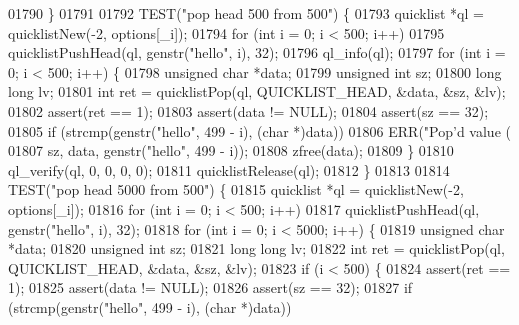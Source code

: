 \begin{DoxyCode}
{{{{{{{{{{{{{{{{{{{{{{{{{{{{{{{{{{{{{{{{{{01790         \}
01791 
01792         TEST(\textcolor{stringliteral}{"pop head 500 from 500"}) \{
01793             quicklist *ql = quicklistNew(-2, options[\_i]);
01794             \textcolor{keywordflow}{for} (\textcolor{keywordtype}{int} i = 0; i < 500; i++)
01795                 quicklistPushHead(ql, genstr(\textcolor{stringliteral}{"hello"}, i), 32);
01796             ql\_info(ql);
01797             \textcolor{keywordflow}{for} (\textcolor{keywordtype}{int} i = 0; i < 500; i++) \{
01798                 \textcolor{keywordtype}{unsigned} \textcolor{keywordtype}{char} *data;
01799                 \textcolor{keywordtype}{unsigned} \textcolor{keywordtype}{int} sz;
01800                 \textcolor{keywordtype}{long} \textcolor{keywordtype}{long} lv;
01801                 \textcolor{keywordtype}{int} ret = quicklistPop(ql, QUICKLIST\_HEAD, &data, &sz, &lv);
01802                 assert(ret == 1);
01803                 assert(data != NULL);
01804                 assert(sz == 32);
01805                 \textcolor{keywordflow}{if} (strcmp(genstr(\textcolor{stringliteral}{"hello"}, 499 - i), (\textcolor{keywordtype}{char} *)data))
01806                     ERR(\textcolor{stringliteral}{"Pop'd value (%
01807                         sz, data, genstr(\textcolor{stringliteral}{"hello"}, 499 - i));
01808                 zfree(data);
01809             \}
01810             ql\_verify(ql, 0, 0, 0, 0);
01811             quicklistRelease(ql);
01812         \}
01813 
01814         TEST(\textcolor{stringliteral}{"pop head 5000 from 500"}) \{
01815             quicklist *ql = quicklistNew(-2, options[\_i]);
01816             \textcolor{keywordflow}{for} (\textcolor{keywordtype}{int} i = 0; i < 500; i++)
01817                 quicklistPushHead(ql, genstr(\textcolor{stringliteral}{"hello"}, i), 32);
01818             \textcolor{keywordflow}{for} (\textcolor{keywordtype}{int} i = 0; i < 5000; i++) \{
01819                 \textcolor{keywordtype}{unsigned} \textcolor{keywordtype}{char} *data;
01820                 \textcolor{keywordtype}{unsigned} \textcolor{keywordtype}{int} sz;
01821                 \textcolor{keywordtype}{long} \textcolor{keywordtype}{long} lv;
01822                 \textcolor{keywordtype}{int} ret = quicklistPop(ql, QUICKLIST\_HEAD, &data, &sz, &lv);
01823                 \textcolor{keywordflow}{if} (i < 500) \{
01824                     assert(ret == 1);
01825                     assert(data != NULL);
01826                     assert(sz == 32);
01827                     \textcolor{keywordflow}{if} (strcmp(genstr(\textcolor{stringliteral}{"hello"}, 499 - i), (\textcolor{keywordtype}{char} *)data))
}}}}}}}}}}}}}}}}}}}}}}}}}}}}}}}}}}}}}}}}}}}
\end{DoxyCode}
